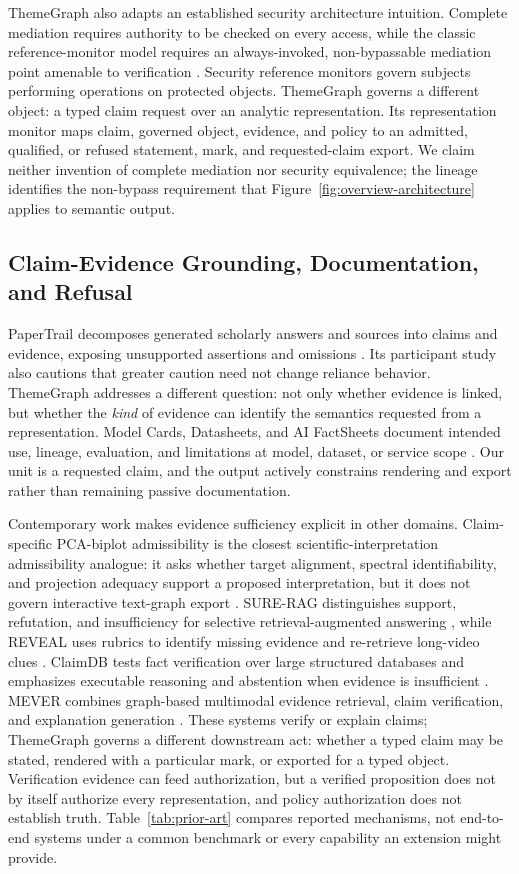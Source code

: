 \documentclass[manuscript,screen,review,anonymous]{acmart}
\begin{document}
ThemeGraph also adapts an established security architecture intuition. Complete mediation requires authority to be checked on every access, while the classic reference-monitor model requires an always-invoked, non-bypassable mediation point amenable to verification \cite{anderson1972,saltzer1975}. Security reference monitors govern subjects performing operations on protected objects. ThemeGraph governs a different object: a typed claim request over an analytic representation. Its representation monitor maps claim, governed object, evidence, and policy to an admitted, qualified, or refused statement, mark, and requested-claim export. We claim neither invention of complete mediation nor security equivalence; the lineage identifies the non-bypass requirement that Figure~\ref{fig:overview-architecture} applies to semantic output.

\subsection{Claim-Evidence Grounding, Documentation, and Refusal}

PaperTrail decomposes generated scholarly answers and sources into claims and evidence, exposing unsupported assertions and omissions \cite{martinboyle2026}. Its participant study also cautions that greater caution need not change reliance behavior. ThemeGraph addresses a different question: not only whether evidence is linked, but whether the \emph{kind} of evidence can identify the semantics requested from a representation. Model Cards, Datasheets, and AI FactSheets document intended use, lineage, evaluation, and limitations at model, dataset, or service scope \cite{mitchell2019,gebru2021,arnold2019}. Our unit is a requested claim, and the output actively constrains rendering and export rather than remaining passive documentation.

Contemporary work makes evidence sufficiency explicit in other domains. Claim-specific PCA-biplot admissibility is the closest scientific-interpretation admissibility analogue: it asks whether target alignment, spectral identifiability, and projection adequacy support a proposed interpretation, but it does not govern interactive text-graph export \cite{pinto2026}. SURE-RAG distinguishes support, refutation, and insufficiency for selective retrieval-augmented answering \cite{qiu2026}, while REVEAL uses rubrics to identify missing evidence and re-retrieve long-video clues \cite{yan2026}. ClaimDB tests fact verification over large structured databases and emphasizes executable reasoning and abstention when evidence is insufficient \cite{theologitis2026}. MEVER combines graph-based multimodal evidence retrieval, claim verification, and explanation generation \cite{zhang2026mever}. These systems verify or explain claims; ThemeGraph governs a different downstream act: whether a typed claim may be stated, rendered with a particular mark, or exported for a typed object. Verification evidence can feed authorization, but a verified proposition does not by itself authorize every representation, and policy authorization does not establish truth. Table~\ref{tab:prior-art} compares reported mechanisms, not end-to-end systems under a common benchmark or every capability an extension might provide.
\end{document}

